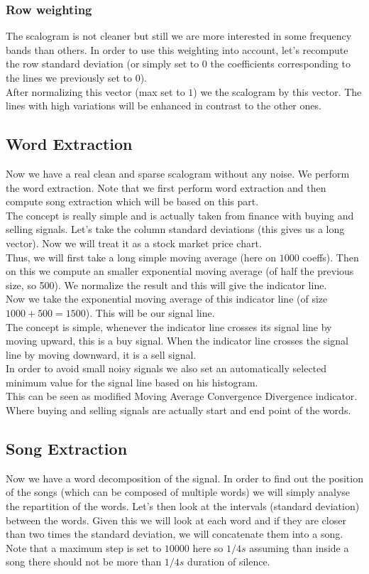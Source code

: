 \documentclass[a4paper]{article}
\begin{document}
\subsubsection{Row weighting}
The scalogram is not cleaner but still we are more interested in some frequency bands than others. In order to use this weighting into account, let's recompute the row standard deviation (or simply set to $0$ the coefficients corresponding to the lines we previously set to $0$). 
\\
After normalizing this vector (max set to $1$) we the scalogram by this vector.
The lines with high variations will be enhanced in contrast to the other ones.
\subsection{Word Extraction}
Now we have a real clean and sparse scalogram without any noise. We perform the word extraction. Note that we first perform word extraction and then compute song extraction which will be based on this part.
\\
The concept is really simple and is actually taken from finance with buying and selling signals. Let's take the column standard deviations (this gives us a long vector). Now we will treat it as a stock market price chart.\\
Thus, we will first take a long simple moving average (here on $1000$ coeffs). Then on this we compute an smaller exponential moving average (of half the previous size, so 500). We normalize the result and this will give the indicator line.
\\
Now we take the exponential moving average of this indicator line (of size $1000+500=1500$). This will be our signal line.
\\
The concept is simple, whenever the indicator line crosses its signal line by moving upward, this is a buy signal. When the indicator line crosses the signal line by moving downward, it is a sell signal.
\\
In order to avoid small noisy signals we also set an automatically selected minimum value for the signal line based on his histogram.
\\
This can be seen as modified Moving Average Convergence Divergence indicator. Where buying and selling signals are actually start and end point of the words.
\subsection{Song Extraction}
Now we have a word decomposition of the signal. In order to find out the position of the songs (which can be composed of multiple words) we will simply analyse the repartition of the words. Let's then look at the intervals (standard deviation) between the words. Given this we will look at each word and if they are closer than two times the standard deviation, we will concatenate them into a song. Note that a maximum step is set to $10000$ here so $1/4 s$ assuming than inside a song there should not be more than $1/4 s$ duration of silence.
\end{document}
